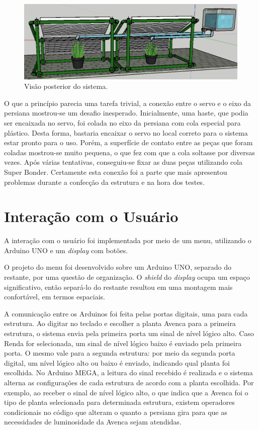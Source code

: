 \documentclass[a4paper,12pt]{report}
\begin{document}
	\begin{figure}[!h]
	\centering
	\includegraphics[width=1.0\linewidth]{figs/estru4}
	\caption{Visão posterior do sistema.}
	\label{fig:estru4}
	\end{figure}
	
	O que a princípio parecia uma tarefa trivial, a conexão entre o servo e o eixo da persiana mostrou-se um desafio inesperado. Inicialmente, uma haste, que podia ser encaixada no servo, foi colada no eixo da persiana com cola especial para plástico. Desta forma, bastaria encaixar o servo no local correto para o sistema estar pronto para o uso. Porém, a superfície de contato entre as peças que foram coladas mostrou-se muito pequena, o que fez com que a cola soltasse por diversas vezes. Após várias tentativas, conseguiu-se fixar as duas peças utilizando cola Super Bonder. Certamente esta conexão foi a parte que mais apresentou problemas durante a confecção da estrutura e na hora dos testes.
	
	\cleardoublepage
	\section{Interação com o Usuário}
	\label{sec:comunicaoArduinos}
	A interação com o usuário foi implementada por meio de um menu, utilizando o Arduino UNO e um \textit{display} com botões.
	
	O projeto do menu foi desenvolvido sobre um Arduino UNO, separado do restante, por uma questão de organização. O \textit{shield} do \textit{display} ocupa um espaço significativo, então separá-lo do restante resultou em uma montagem mais confortável, em termos espaciais. 
	
	A comunicação entre os Arduinos foi feita pelas portas digitais, uma para cada estrutura. Ao digitar no teclado e escolher a planta Avenca para a primeira estrutura, o sistema envia pela primeira porta um sinal de nível lógico alto. Caso Renda for selecionada, um sinal de nível lógico baixo é enviado pela primeira porta. O mesmo vale para a segunda estrutura: por meio da segunda porta digital, um nível lógico alto ou baixo é enviado, indicando qual planta foi escolhida. 
	No Arduino MEGA, a leitura do sinal recebido é realizada e o sistema alterna as configurações de cada estrutura de acordo com a planta escolhida. Por exemplo, ao receber o sinal de nível lógico alto, o que indica que a Avenca foi o tipo de planta selecionada para determinada estrutura, existem operadores condicionais no código que alteram o quanto a persiana gira para que as necessidades de luminosidade da Avenca sejam atendidas. 
	
\end{document}
